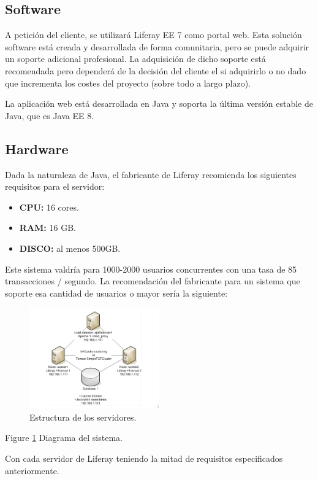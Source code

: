 \subsection{Software}
\par A petición del cliente, se utilizará Liferay EE 7 como portal web. Esta solución software está creada y desarrollada de forma comunitaria, pero se puede adquirir un soporte adicional profesional. La adquisición de dicho soporte está recomendada pero dependerá de la decisión del cliente el si adquirirlo o no dado que incrementa los costes del proyecto (sobre todo a largo plazo).
\par La aplicación web está desarrollada en Java y soporta la última versión estable de Java, que es Java EE 8.

\subsection{Hardware}
\par Dada la naturaleza de Java, el fabricante de Liferay recomienda los siguientes requisitos para el servidor:
\begin{itemize}
	\item \textbf{CPU:} 16 cores.
	\item \textbf{RAM:} 16 GB.
	\item \textbf{DISCO:} al menos 500GB.
\end{itemize}
\par Este sistema valdría para 1000-2000 usuarios concurrentes con una tasa de 85 transacciones / segundo. La recomendación del fabricante para un sistema que soporte esa cantidad de usuarios o mayor sería la siguiente:

\begin{figure}
  \centering
    \includegraphics[width=0.5\textwidth]{./img/systemstructure.png}
  \caption{Estructura de los servidores.}
  \label{fig:systemstructure}
\end{figure}
Figure \ref{fig:systemstructure} Diagrama del sistema.

\par Con cada servidor de Liferay teniendo la mitad de requisitos especificados anteriormente.
